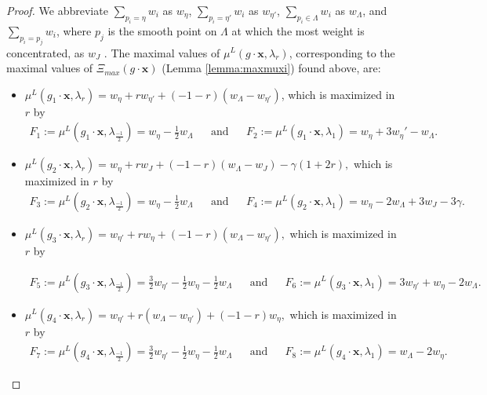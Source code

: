 \documentclass{amsart}
\numberwithin{equation}{section}
\theoremstyle{definition}
\begin{document}
\begin{proof}
We abbreviate $\sum_{p_i = \eta} w_i$ as $w_{\eta}$, $\sum_{p_i = \eta'} w_i$ as $w_{\eta'}$, $\sum_{p_i \in \Lambda} w_i$ as $w_{\Lambda}$, and $\sum_{p_i = p_j} w_i$, where $p_j$ is the smooth point on $\Lambda$ at which the most weight is concentrated, as $w_{J}$ . The maximal values of $\mu^L( g \cdot \mathbf{x}, \lambda_r)$, corresponding to the maximal values of $\Xi_{max} (g \cdot \mathbf{x})$ (Lemma \ref{lemma:maxmuxi}) found above, are:

\begin{itemize}
    \item $\mu^L(g_1 \cdot \mathbf{x}, \lambda_r) = w_\eta + r w_{\eta'} + (-1-r)(w_\Lambda - w_{\eta'})$, which is maximized in $r$ by  
    \begin{align*} F_1 := \mu^L (g_1 \cdot \mathbf{x}, \lambda_{\frac{-1}{2}}) = w_\eta - \frac{1}{2} w_\Lambda &&
    \text{and} && F_2:= \mu^L (g_1 \cdot \mathbf{x}, \lambda_1) = w_\eta+ 3 w_\eta' - w_\Lambda.\end{align*}

    \item $\mu^L(g_2 \cdot \mathbf{x}, \lambda_r) = w_\eta + r w_J + (-1-r)(w_\Lambda - w_J) - \gamma(1+2r), $ which is maximized in $r$ by
\begin{align*}
    F_3:= \mu^L(g_2 \cdot \mathbf{x}, \lambda_{\frac{-1}{2}}) = w_\eta - \frac{1}{2}w_\Lambda
    && \text{and} && F_4:=\mu^L(g_2 \cdot \mathbf{x}, \lambda_1) = w_\eta - 2w_\Lambda + 3w_J - 3 \gamma.
\end{align*}
    
    \item $\mu^L(g_3 \cdot \mathbf{x}, \lambda_r) = w_{\eta'}  + rw_\eta + (-1-r)(w_\Lambda - w_{\eta'}),$ which is maximized in $r$ by

    \begin{align*}
      F_5:=  \mu^L(g_3 \cdot \mathbf{x}, \lambda_{\frac{-1}{2}}) = \frac{3}{2}w_{\eta'} - \frac{1}{2}w_\eta - \frac{1}{2} w_\Lambda
      && \text{and} && F_6:= \mu^L(g_3 \cdot \mathbf{x}, \lambda_1) = 3 w_{\eta'} + w_\eta - 2 w_\Lambda .
    \end{align*}
    
    \item $\mu^L(g_4 \cdot \mathbf{x}, \lambda_r) =  w_{\eta'} + r(w_\Lambda - w_{\eta'}) + (-1-r)w_\eta,$
    which is maximized in $r$ by
    \begin{align*}
        F_7 := \mu^L(g_4 \cdot \mathbf{x}, \lambda_{\frac{-1}{2}}) = \frac{3}{2}w_{\eta'} - \frac{1}{2}w_\eta - \frac{1}{2}w_\Lambda
        && \text{and} && 
        F_8:= \mu^L(g_4 \cdot \mathbf{x}, \lambda_1) = w_\Lambda - 2 w_\eta.
    \end{align*}


\end{itemize}
\end{proof}
\end{document}
